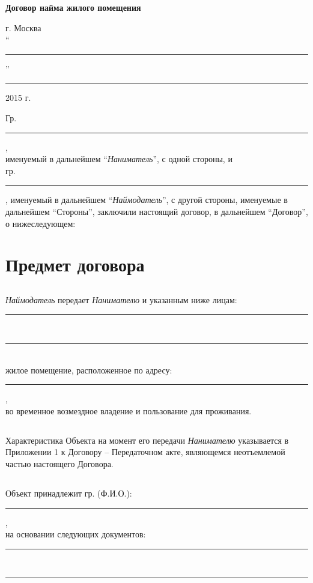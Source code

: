 \documentclass[a4paper, 11pt]{article}
\begin{document}
\begin{center}
{\large\textbf{Договор найма жилого помещения}} \\
\end{center}

\begin{flushright}
г. Москва \\
``\rule{2cm}{0.5pt}'' \rule{4cm}{0.5pt} 2015 г. \\
\end{flushright}



Гр. \rule{0.85\textwidth}{0.5pt}, \\
именуемый в дальнейшем ``\textit{Наниматель}'', с одной стороны, и\\
гр. \rule{0.85\textwidth}{0.5pt},
именуемый в дальнейшем ``\textit{Наймодатель}'', с другой стороны,
именуемые в дальнейшем ``Стороны'', заключили
настоящий договор, в дальнейшем ``Договор'', о нижеследующем:

\section{Предмет договора}
\subsection{}\textit{Наймодатель} передает \textit{Нанимателю} и указанным ниже лицам:\\
\rule{0.95\textwidth}{0.5pt}\\
\rule{\textwidth}{0.5pt}\\
жилое помещение, расположенное по адресу: \\
\rule{\textwidth}{0.5pt},\\
во временное возмездное владение и пользование для проживания.
\subsection{} Характеристика Объекта на момент его передачи \textit{Нанимателю} указывается в
Приложении 1 к Договору -- Передаточном акте, являющемся неотъемлемой частью
настоящего Договора.
\subsection{} Объект принадлежит гр. (Ф.И.О.): \\
\rule{0.95\textwidth}{0.5pt},\\
на основании следующих документов: \\
\rule{\textwidth}{0.5pt}\\
\rule{\textwidth}{0.5pt}\\
\end{document}
